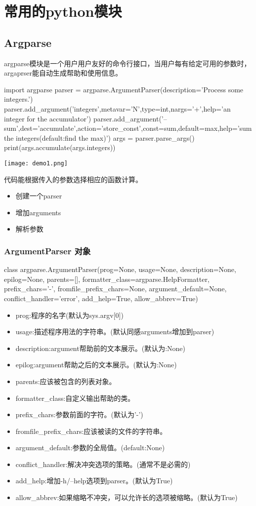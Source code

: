 \chapter{常用的python模块}
\section{Argparse}
argparse模块是一个用户用户友好的命令行接口，当用户每有给定可用的参数时，argaprser能自动生成帮助和使用信息。
\begin{python}
import argparse
parser = argparse.ArgumentParser(description='Process some integers.')
parser.add_argument('integers',metavar='N',type=int,nargs='+',help='an integer for the accumulator')
parser.add_argument('--sum',dest='accumulate',action='store_const',const=sum,default=max,help='sum the integers(default:find the max)')
args = parser.parse_args()
print(args.accumulate(args.integers))
\end{python}
\texttt{[image: demo1.png]}\newline

代码能根据传入的参数选择相应的函数计算。
\begin{itemize}
\item 创建一个parser
\item 增加arguments
\item 解析参数
\end{itemize}

\subsection{ArgumentParser 对象}
class argparse.ArgumentParser(prog=None, usage=None, description=None, epilog=None, parents=[], formatter\_class=argparse.HelpFormatter, prefix\_chars='-', fromfile\_prefix\_chars=None, argument\_default=None, conflict\_handler='error', add\_help=True, allow\_abbrev=True)
\begin{itemize}
\item prog:程序的名字(默认为sys.argv[0])
\item usage:描述程序用法的字符串。(默认同感arguments增加到parser)
\item description:argument帮助前的文本展示。(默认为:None)
\item epilog:argument帮助之后的文本展示。(默认为:None)
\item parents:应该被包含的列表对象。
\item formatter\_class:自定义输出帮助的类。
\item prefix\_chars:参数前面的字符。(默认为'-')
\item fromfile\_prefix\_chars:应该被读的文件的字符串。
\item argument\_default:参数的全局值。(default:None)
\item conflict\_handler:解决冲突选项的策略。(通常不是必需的)
\item add\_help:增加-h/--help选项到parser。(默认为True)
\item allow\_abbrev:如果缩略不冲突，可以允许长的选项被缩略。(默认为True)
\end{itemize}
